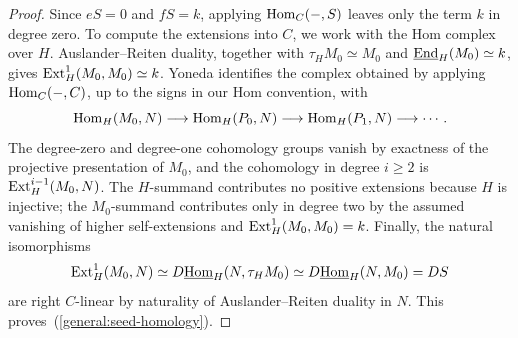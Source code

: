 \documentclass[11pt]{article}
\begin{document}
\begin{proof}
Since $eS=0$ and $fS=k$, applying ${\rm Hom}_C(-,S)$ leaves only the term
$k$ in degree zero. To compute the extensions into $C$, we work
with the Hom complex over $H$. Auslander--Reiten duality, together with
$\tau_HM_0\simeq M_0$ and $\underline{{\rm End}}_H(M_0)\simeq k$, gives
${\rm Ext}_H^1(M_0,M_0)\simeq k$. Yoneda identifies the complex obtained by
applying ${\rm Hom}_C(-,C)$, up to the signs in our Hom convention, with
\begin{equation*}
 {\rm Hom}_H(M_0,N)\longrightarrow{\rm Hom}_H(P_0,N)
 \longrightarrow{\rm Hom}_H(P_1,N)\longrightarrow\cdots.
\end{equation*}
The degree-zero and degree-one cohomology groups vanish by exactness of
the projective presentation of $M_0$, and the cohomology in degree $i\ge2$ is
${\rm Ext}_H^{i-1}(M_0,N)$.  The $H$-summand contributes no positive
extensions because $H$ is injective; the $M_0$-summand contributes
only in degree two by the assumed vanishing of higher self-extensions
and ${\rm Ext}_H^1(M_0,M_0)=k$.  Finally, the natural isomorphisms
\[
 {\rm Ext}_H^1(M_0,N)
 \simeq D\underline{{\rm Hom}}_H(N,\tau_HM_0)
 \simeq D\underline{{\rm Hom}}_H(N,M_0)=DS
\]
are right $C$-linear by naturality of Auslander--Reiten duality in
$N$. This proves~\textup{(\ref{general:seed-homology})}.


\end{proof}
\end{document}
